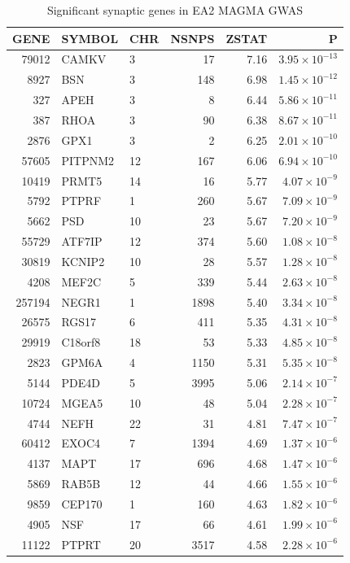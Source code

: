\begin{table}[ht]
\centering
\begin{tabular}{rllrrr}
  \hline
GENE & SYMBOL & CHR & NSNPS & ZSTAT & P \\ 
  \hline
79012 & CAMKV & 3 &  17 & 7.16 & $3.95 \times 10^{-13}$ \\ 
  8927 & BSN & 3 & 148 & 6.98 & $1.45 \times 10^{-12}$ \\ 
  327 & APEH & 3 &   8 & 6.44 & $5.86 \times 10^{-11}$ \\ 
  387 & RHOA & 3 &  90 & 6.38 & $8.67 \times 10^{-11}$ \\ 
  2876 & GPX1 & 3 &   2 & 6.25 & $2.01 \times 10^{-10}$ \\ 
  57605 & PITPNM2 & 12 & 167 & 6.06 & $6.94 \times 10^{-10}$ \\ 
  10419 & PRMT5 & 14 &  16 & 5.77 & $4.07 \times 10^{-9}$ \\ 
  5792 & PTPRF & 1 & 260 & 5.67 & $7.09 \times 10^{-9}$ \\ 
  5662 & PSD & 10 &  23 & 5.67 & $7.20 \times 10^{-9}$ \\ 
  55729 & ATF7IP & 12 & 374 & 5.60 & $1.08 \times 10^{-8}$ \\ 
  30819 & KCNIP2 & 10 &  28 & 5.57 & $1.28 \times 10^{-8}$ \\ 
  4208 & MEF2C & 5 & 339 & 5.44 & $2.63 \times 10^{-8}$ \\ 
  257194 & NEGR1 & 1 & 1898 & 5.40 & $3.34 \times 10^{-8}$ \\ 
  26575 & RGS17 & 6 & 411 & 5.35 & $4.31 \times 10^{-8}$ \\ 
  29919 & C18orf8 & 18 &  53 & 5.33 & $4.85 \times 10^{-8}$ \\ 
  2823 & GPM6A & 4 & 1150 & 5.31 & $5.35 \times 10^{-8}$ \\ 
  5144 & PDE4D & 5 & 3995 & 5.06 & $2.14 \times 10^{-7}$ \\ 
  10724 & MGEA5 & 10 &  48 & 5.04 & $2.28 \times 10^{-7}$ \\ 
  4744 & NEFH & 22 &  31 & 4.81 & $7.47 \times 10^{-7}$ \\ 
  60412 & EXOC4 & 7 & 1394 & 4.69 & $1.37 \times 10^{-6}$ \\ 
  4137 & MAPT & 17 & 696 & 4.68 & $1.47 \times 10^{-6}$ \\ 
  5869 & RAB5B & 12 &  44 & 4.66 & $1.55 \times 10^{-6}$ \\ 
  9859 & CEP170 & 1 & 160 & 4.63 & $1.82 \times 10^{-6}$ \\ 
  4905 & NSF & 17 &  66 & 4.61 & $1.99 \times 10^{-6}$ \\ 
  11122 & PTPRT & 20 & 3517 & 4.58 & $2.28 \times 10^{-6}$ \\ 
   \hline
\end{tabular}
\caption{Significant synaptic genes in EA2  MAGMA GWAS} 
\label{tab:Significant synaptic genes in EA2  MAGMA GWAS}
\end{table}




